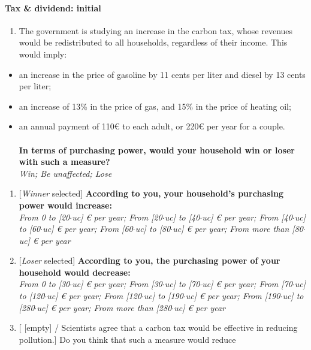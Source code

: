 \documentclass[12pt]{article} %
\begin{document}
\begin{appendices}
\paragraph{Tax \& dividend: initial}
\begin{enumerate}[resume,leftmargin=*]
\item The government is studying an increase in the carbon tax, whose revenues
would be redistributed to all households, regardless of their income.
This would imply: 
\end{enumerate}
\begin{itemize}
\item an increase in the price of gasoline by 11 cents per liter and diesel
by 13 cents per liter; 
\item an increase of 13\% in the price of gas, and 15\% in the price of
heating oil;
\item an annual payment of 110\euro{} to each adult, or 220\euro{} per year for a couple.
\\
\\
\textbf{In terms of purchasing power, would your household win or
loser with such a measure? }\emph{}\\
\emph{Win; Be unaffected; Lose}
\end{itemize}
\begin{enumerate}[resume,leftmargin=*]
\item {[}\emph{Winner} selected{]} \textbf{According to you, your household's
purchasing power would increase:} \emph{}\\
\emph{From 0 to {[}20$\cdot$uc{]} \euro{} per year; From {[}20$\cdot$uc{]}
to {[}40$\cdot$uc{]} \euro{} per year; From {[}40$\cdot$uc{]} to {[}60$\cdot$uc{]}
\euro{} per year; From {[}60$\cdot$uc{]} to {[}80$\cdot$uc{]} \euro{} per year;
From more than {[}80$\cdot$uc{]} \euro{} per year}
\item {[}\emph{Loser} selected{]} \textbf{According to you, the purchasing
power of your household would decrease:} \emph{}\\
\emph{From 0 to {[}30$\cdot$uc{]} \euro{} per year; From {[}30$\cdot$uc{]}
to {[}70$\cdot$uc{]} \euro{} per year; From {[}70$\cdot$uc{]} to {[}120$\cdot$uc{]}
\euro{} per year; From {[}120$\cdot$uc{]} to {[}190$\cdot$uc{]} \euro{} per
year; From {[}190$\cdot$uc{]} to {[}280$\cdot$uc{]} \euro{} per year;
From more than {[}280$\cdot$uc{]} \euro{} per year} 
\item {[} {[}empty{]} / Scientists agree that a carbon tax would be effective
in reducing pollution.{]} Do you think that such a measure would reduce

\end{enumerate}
\end{appendices}
\end{document}
